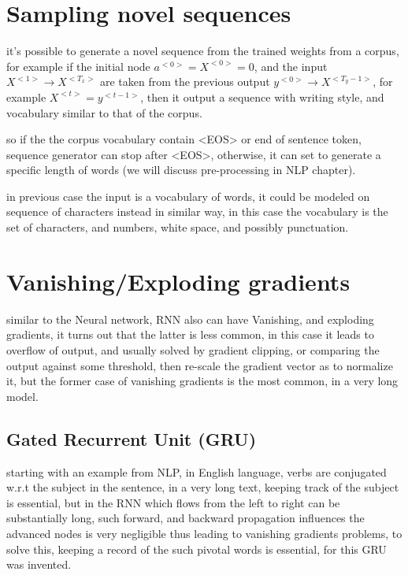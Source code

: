 \documentclass[4apaper,12pt]{book}
\begin{document}
\begin{description}
    \section{Sampling novel sequences}
    \begin{description}
    \item it's possible to generate a novel sequence from the trained weights from a corpus, for example if the initial node $a^{<0>}=X^{<0>}=0$, and the input $X^{<1>} \to X^{<T_x>}$ are taken from the previous output $y^{<0>} \to X^{<T_y-1>}$, for example $X^{<t>}=y^{<t-1>}$, then it output a sequence with writing style, and vocabulary similar to that of the corpus.
    \item so if the the corpus vocabulary contain <EOS> or end of sentence token, sequence generator can stop after <EOS>, otherwise, it can set to generate a specific length of words (we will discuss pre-processing in NLP chapter).
    \item in previous case the input is a vocabulary of words, it could be modeled on sequence of characters instead in similar way, in this case the vocabulary is the set of characters, and numbers, white space, and possibly punctuation.
    \end{description}
    \section{Vanishing/Exploding gradients}
    \begin{description}
    \item similar to the Neural network, RNN also can have Vanishing, and exploding gradients, it turns out that the latter is less common, in this case it leads to overflow of output, and usually solved by gradient clipping, or comparing the output against some threshold, then re-scale the gradient vector as to normalize it, but the former case of vanishing gradients is the most common, in a very long model.
      \subsection{Gated Recurrent Unit (GRU)}
      \begin{description}
      \item starting with an example from NLP, in English language, verbs are conjugated w.r.t the subject in the sentence, in a very long text, keeping track of the subject is essential, but in the RNN which flows from the left to right can be substantially long, such  forward, and backward propagation influences the advanced nodes is very negligible thus leading to vanishing gradients problems, to solve this, keeping a record of the such pivotal words is essential, for this GRU was invented.


\end{description}
\end{description}
\end{description}
\end{document}
